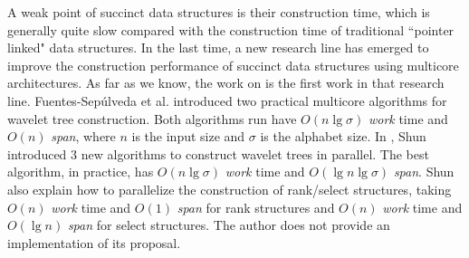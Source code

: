 A weak point of succinct data structures is their construction time, which is generally quite slow compared with the construction time of traditional ``pointer linked" data structures. In the last time, a new research line has emerged to improve the construction performance of succinct data structures using multicore architectures. As far as we know, the work on \cite{Fuentes2014} is the first work in that research line. Fuentes-Sep\'ulveda et al. introduced two practical multicore algorithms for wavelet tree construction. Both algorithms run have $O(n\lg \sigma)$ {\em work} time and $O(n)$ {\em span}, where $n$ is the input size and $\sigma$ is the alphabet size. In \cite{DBLP:journals/corr/Shun14}, Shun introduced 3 new algorithms to construct wavelet trees in parallel. The best algorithm, in practice, has $O(n\lg \sigma)$ {\em work} time and $O(\lg n\lg \sigma)$ {\em span}. Shun also explain how to parallelize the construction of rank/select structures, taking $O(n)$ {\em work} time and $O(1)$ {\em span} for rank structures and $O(n)$ {\em work} time and $O(\lg n)$ {\em span} for select structures. The author does not provide an implementation of its proposal.